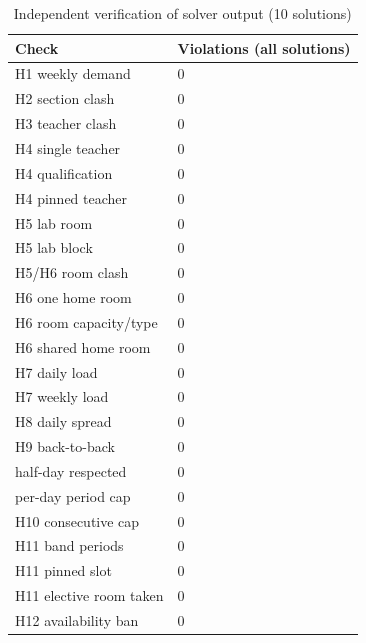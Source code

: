\begin{table}[t]
\centering
\small
\begin{tabular}{ll}
\toprule
Check & Violations (all solutions) \\
\midrule
H1 weekly demand & 0 \\
H2 section clash & 0 \\
H3 teacher clash & 0 \\
H4 single teacher & 0 \\
H4 qualification & 0 \\
H4 pinned teacher & 0 \\
H5 lab room & 0 \\
H5 lab block & 0 \\
H5/H6 room clash & 0 \\
H6 one home room & 0 \\
H6 room capacity/type & 0 \\
H6 shared home room & 0 \\
H7 daily load & 0 \\
H7 weekly load & 0 \\
H8 daily spread & 0 \\
H9 back-to-back & 0 \\
half-day respected & 0 \\
per-day period cap & 0 \\
H10 consecutive cap & 0 \\
H11 band periods & 0 \\
H11 pinned slot & 0 \\
H11 elective room taken & 0 \\
H12 availability ban & 0 \\
\bottomrule
\end{tabular}
\caption{Independent verification of solver output (10 solutions)}
\label{tab:t5-hard-constraints}
\end{table}
